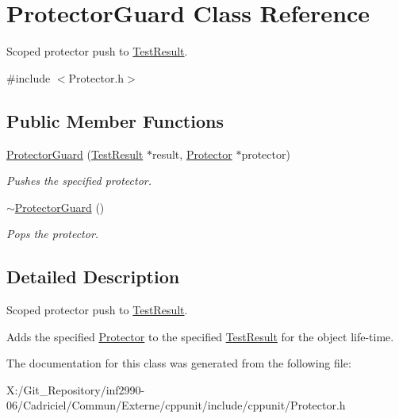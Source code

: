 \hypertarget{class_protector_guard}{\section{Protector\-Guard Class Reference}
\label{class_protector_guard}
}


Scoped protector push to \hyperlink{class_test_result}{Test\-Result}.  




{\ttfamily \#include $<$Protector.\-h$>$}

\subsection*{Public Member Functions}
\begin{DoxyCompactItemize}
\item 
\hypertarget{class_protector_guard_abc4a3b2b51b6d93fb3dd9fed1bbc85db}{\hyperlink{class_protector_guard_abc4a3b2b51b6d93fb3dd9fed1bbc85db}{Protector\-Guard} (\hyperlink{class_test_result}{Test\-Result} $\ast$result, \hyperlink{class_protector}{Protector} $\ast$protector)}\label{class_protector_guard_abc4a3b2b51b6d93fb3dd9fed1bbc85db}

\begin{DoxyCompactList}\small\item\em Pushes the specified protector. \end{DoxyCompactList}\item 
\hypertarget{class_protector_guard_af80b574cc5999746e77ec13d2d0093f5}{\hyperlink{class_protector_guard_af80b574cc5999746e77ec13d2d0093f5}{$\sim$\-Protector\-Guard} ()}\label{class_protector_guard_af80b574cc5999746e77ec13d2d0093f5}

\begin{DoxyCompactList}\small\item\em Pops the protector. \end{DoxyCompactList}\end{DoxyCompactItemize}


\subsection{Detailed Description}
Scoped protector push to \hyperlink{class_test_result}{Test\-Result}. 

Adds the specified \hyperlink{class_protector}{Protector} to the specified \hyperlink{class_test_result}{Test\-Result} for the object life-\/time. 

The documentation for this class was generated from the following file\-:\begin{DoxyCompactItemize}
\item 
X\-:/\-Git\-\_\-\-Repository/inf2990-\/06/\-Cadriciel/\-Commun/\-Externe/cppunit/include/cppunit/Protector.\-h\end{DoxyCompactItemize}
